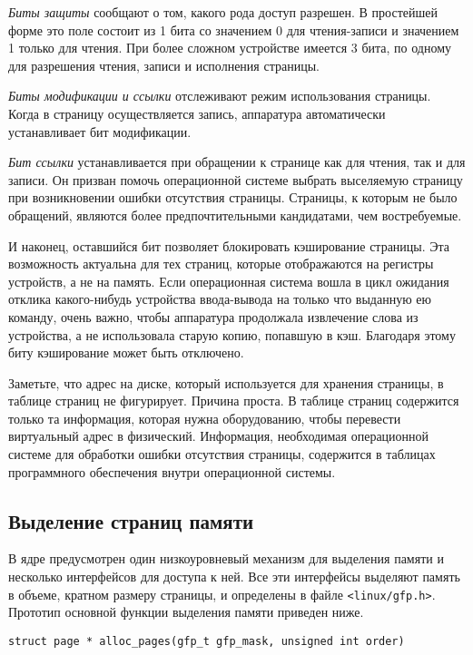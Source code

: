 \documentclass[12pt]{article}
\begin{document}
\emph{Биты защиты} сообщают о том, какого рода доступ разрешен.
В простейшей форме это поле состоит из 1 бита со значением 0 для чтения-записи и значением 1 только для чтения.
При более сложном устройстве имеется 3 бита, по одному для разрешения чтения, записи и исполнения страницы.

\emph{Биты модификации и ссылки} отслеживают режим использования страницы. 
Когда в страницу осуществляется запись, аппаратура автоматически устанавливает бит модификации.

\emph{Бит ссылки} устанавливается при обращении к странице как для чтения, так и для записи. 
Он призван помочь операционной системе выбрать выселяемую страницу при возникновении ошибки отсутствия страницы. 
Страницы, к которым не было обращений, являются более предпочтительными кандидатами, чем востребуемые.

И наконец, оставшийся бит позволяет блокировать кэширование страницы. 
Эта возможность актуальна для тех страниц, которые отображаются на регистры устройств, 
а не на память. Если операционная система вошла в цикл ожидания отклика какого-нибудь устройства ввода-вывода 
на только что выданную ею команду, очень важно, чтобы аппаратура продолжала извлечение слова из устройства, 
а не использовала старую копию, попавшую в кэш. Благодаря этому биту кэширование может быть отключено.

Заметьте, что адрес на диске, который используется для хранения страницы, в таблице страниц не фигурирует. 
Причина проста. В таблице страниц содержится только та информация, которая нужна оборудованию, 
чтобы перевести виртуальный адрес в физический. Информация, необходимая операционной системе для обработки ошибки отсутствия страницы,
содержится в таблицах программного обеспечения внутри операционной системы.

\pagebreak

\subsection*{Выделение страниц памяти}
В ядре предусмотрен один низкоуровневый механизм для выделения памяти и несколько интерфейсов для доступа к ней.
Все эти интерфейсы выделяют память в объеме, кратном размеру страницы, и определены в файле \verb!<linux/gfp.h>!.
Прототип основной функции выделения памяти приведен ниже.

\begin{lstlisting}
struct page * alloc_pages(gfp_t gfp_mask, unsigned int order)
\end{lstlisting}
\end{document}
